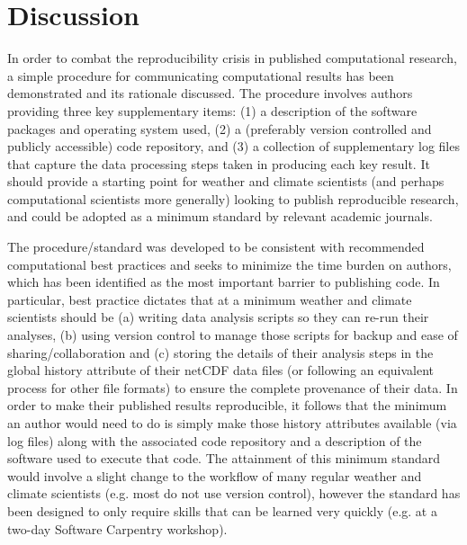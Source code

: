 \section{Discussion}

In order to combat the reproducibility crisis in published computational research, a simple procedure for communicating computational results has been demonstrated \citep[see][]{IrvingSimmonds2015} and its rationale discussed. The procedure involves authors providing three key supplementary items: (1) a description of the software packages and operating system used, (2) a (preferably version controlled and publicly accessible) code repository, and (3) a collection of supplementary log files that capture the data processing steps taken in producing each key result. It should provide a starting point for weather and climate scientists (and perhaps computational scientists more generally) looking to publish reproducible research, and could be adopted as a minimum standard by relevant academic journals.

The procedure/standard was developed to be consistent with recommended computational best practices and seeks to minimize the time burden on authors, which has been identified as the most important barrier to publishing code. In particular, best practice dictates that at a minimum weather and climate scientists should be (a) writing data analysis scripts so they can re-run their analyses, (b) using version control to manage those scripts for backup and ease of sharing/collaboration and (c) storing the details of their analysis steps in the global history attribute of their netCDF data files (or following an equivalent process for other file formats) to ensure the complete provenance of their data. In order to make their published results reproducible, it follows that the minimum an author would need to do is simply make those history attributes available (via log files) along with the associated code repository and a description of the software used to execute that code. The attainment of this minimum standard would involve a slight change to the workflow of many regular weather and climate scientists (e.g. most do not use version control), however the standard has been designed to only require skills that can be learned very quickly (e.g. at a two-day Software Carpentry workshop).  


